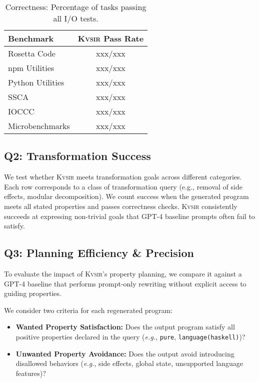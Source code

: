 \documentclass[sigplan]{acmart}
\def\eg{{\em e.g.}, }
\newcommand{\sys}{{\scshape Kv{\textalpha}sir}\xspace}
\newcommand{\xxx}{\colorbox{red!30}{xxx}\xspace}
\begin{document}
\begin{table}[h]
  \centering
  \caption{Correctness: Percentage of tasks passing all I/O tests.}
  \begin{tabular}{lc}
    \toprule
    Benchmark & \sys Pass Rate \\ 
    \midrule
    Rosetta Code & \xxx/\xxx  \\
    npm Utilities & \xxx/\xxx \\
    Python Utilities & \xxx/\xxx \\
    SSCA & \xxx/\xxx  \\
    IOCCC & \xxx/\xxx  \\
    Microbenchmarks & \xxx/\xxx  \\
    \bottomrule
  \end{tabular}
\end{table}

\subsection{Q2: Transformation Success}

We test whether \sys meets transformation goals across different categories.
Each row corresponds to a class of transformation query (e.g., removal of side effects, modular decomposition).
We count success when the generated program meets all stated properties and passes correctness checks.
\sys consistently succeeds at expressing non-trivial goals that GPT-4 baseline prompts often fail to satisfy.

\subsection{Q3: Planning Efficiency \& Precision}

To evaluate the impact of \sys's property planning, we compare it against a GPT-4 baseline that performs prompt-only rewriting without explicit access to guiding properties.

We consider two criteria for each regenerated program:

\begin{itemize}
  \item \textbf{Wanted Property Satisfaction:} Does the output program satisfy all positive properties declared in the query (\eg \texttt{pure}, \texttt{language(haskell)})?
  \item \textbf{Unwanted Property Avoidance:} Does the output avoid introducing disallowed behaviors (\eg side effects, global state, unsupported language features)?
\end{itemize}
\end{document}
